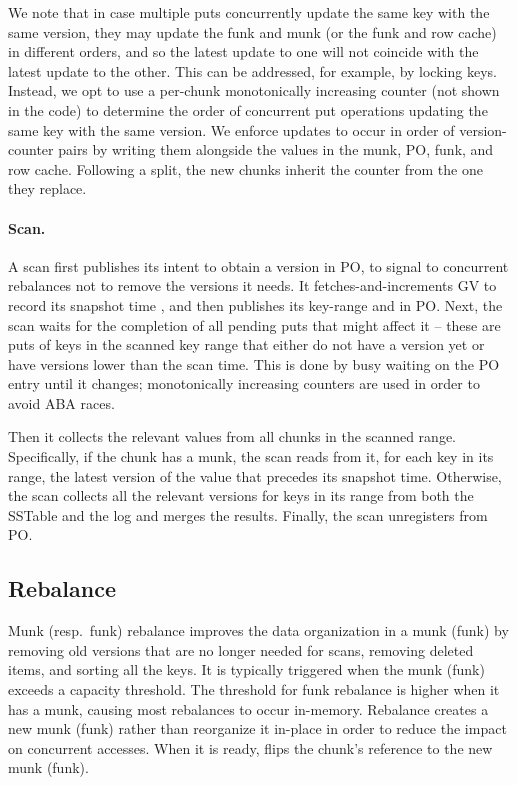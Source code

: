 We note that in case multiple puts concurrently update the same key with the same version, they
may update the funk and munk (or the funk and row cache) in  different orders,
and so the latest update to one will not coincide with the latest update to the other. 
This can be addressed, for example, by locking keys. 
Instead, we opt to use a per-chunk monotonically increasing counter (not shown in the code) to determine 
the order of concurrent put operations updating the same key with the same version. %
We  enforce updates to occur in order of version-counter pairs by writing them alongside the values in the munk, 
PO, funk, and row cache.
Following a split, the new chunks inherit the counter from the one they replace.  


\paragraph{Scan.}
A scan first publishes its intent to obtain a version in PO, to 
signal to concurrent rebalances not to remove the versions it needs. It
fetches-and-increments GV to record its snapshot time ,  
and then publishes its key-range and  in PO.
Next, the scan waits for the completion of all pending puts  
that might affect it  -- these are puts of keys in the scanned key range that either do not have a version yet or have versions lower than the scan time.
This is done by busy waiting on the PO entry until it changes; monotonically increasing counters are used 
in order to avoid ABA races. 

Then it collects the relevant values from all chunks in the scanned range.
Specifically, if the chunk has a munk, the scan reads from it, for each key in its range, 
the latest version of the value that precedes its snapshot time.
Otherwise, the scan collects all the relevant versions for keys in its range from both 
the {SSTable}   and the {log} and merges the results.
Finally, the scan unregisters from PO.

\subsection{Rebalance}
\label{ssec:rebalance}

Munk (resp.\ funk) rebalance improves the data organization in a munk (funk) by removing old versions that are no longer needed 
for scans, removing deleted items, and sorting all the keys. It is typically triggered when the munk (funk) exceeds a capacity threshold.   
The threshold for funk rebalance is higher when it has a munk, causing most rebalances to occur in-memory.
Rebalance creates  a new munk (funk) rather than reorganize it in-place 
in order to reduce the impact on concurrent accesses. When it is ready, \sys\/ flips the 
chunk's reference to the new munk (funk).

